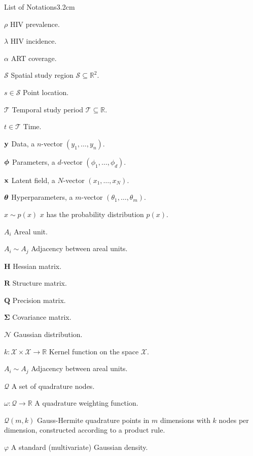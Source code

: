 \begin{mclistof}{List of Notations}{3.2cm}

\item[$\rho$] HIV prevalence.
\item[$\lambda$] HIV incidence.
\item[$\alpha$] ART coverage.
\item[$\mathcal{S}$] Spatial study region $\mathcal{S} \subseteq \mathbb{R}^2$.
\item[$s \in \mathcal{S}$] Point location.
\item[$\mathcal{T}$] Temporal study period $\mathcal{T} \subseteq \mathbb{R}$.
\item[$t \in \mathcal{T}$] Time.
\item[$\boldsymbol{\mathbf{y}}$] Data, a $n$-vector $(y_1, \ldots, y_n)$.
\item[$\boldsymbol{\mathbf{\phi}}$] Parameters, a $d$-vector $(\phi_1, \ldots, \phi_d)$.
\item[$\mathbf{x}$] Latent field, a $N$-vector $(x_1, \ldots, x_N)$.
\item[$\bm{\theta}$] Hyperparameters, a $m$-vector $(\theta_1, \ldots, \theta_m)$.
\item[$x \sim p(x)$] $x$ has the probability distribution $p(x)$.
\item[$A_i$] Areal unit.
\item[$A_i \sim A_j$] Adjacency between areal units.
\item[$\mathbf{H}$] Hessian matrix.
\item[$\mathbf{R}$] Structure matrix.
\item[$\mathbf{Q}$] Precision matrix.
\item[$\bm{\Sigma}$] Covariance matrix.
\item[$\mathcal{N}$] Gaussian distribution.
\item[$k: \mathcal{X} \times \mathcal{X} \to \mathbb{R}$] Kernel function on the space $\mathcal{X}$.
\item[$A_i \sim A_j$] Adjacency between areal units.
\item[$\mathcal{Q}$] A set of quadrature nodes.
\item[$\omega: \mathcal{Q} \to \mathbb{R}$] A quadrature weighting function.
\item[$\mathcal{Q}(m, k)$] Gauss-Hermite quadrature points in $m$ dimensions with $k$ nodes per dimension, constructed according to a product rule.
\item[$\varphi$] A standard (multivariate) Gaussian density.

\end{mclistof} 